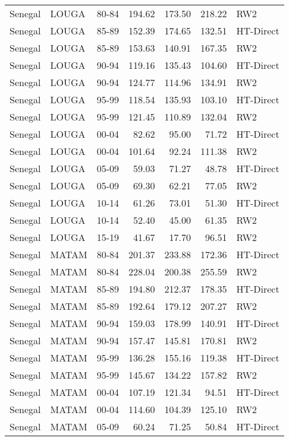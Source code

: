 \begin{longtable}{lllrrrl}
  Senegal & LOUGA & 80-84 & 194.62 & 173.50 & 218.22 & RW2 \\ 
  Senegal & LOUGA & 85-89 & 152.39 & 174.65 & 132.51 & HT-Direct \\ 
  Senegal & LOUGA & 85-89 & 153.63 & 140.91 & 167.35 & RW2 \\ 
  Senegal & LOUGA & 90-94 & 119.16 & 135.43 & 104.60 & HT-Direct \\ 
  Senegal & LOUGA & 90-94 & 124.77 & 114.96 & 134.91 & RW2 \\ 
  Senegal & LOUGA & 95-99 & 118.54 & 135.93 & 103.10 & HT-Direct \\ 
  Senegal & LOUGA & 95-99 & 121.45 & 110.89 & 132.04 & RW2 \\ 
  Senegal & LOUGA & 00-04 & 82.62 & 95.00 & 71.72 & HT-Direct \\ 
  Senegal & LOUGA & 00-04 & 101.64 & 92.24 & 111.38 & RW2 \\ 
  Senegal & LOUGA & 05-09 & 59.03 & 71.27 & 48.78 & HT-Direct \\ 
  Senegal & LOUGA & 05-09 & 69.30 & 62.21 & 77.05 & RW2 \\ 
  Senegal & LOUGA & 10-14 & 61.26 & 73.01 & 51.30 & HT-Direct \\ 
  Senegal & LOUGA & 10-14 & 52.40 & 45.00 & 61.35 & RW2 \\ 
  Senegal & LOUGA & 15-19 & 41.67 & 17.70 & 96.51 & RW2 \\ 
  Senegal & MATAM & 80-84 & 201.37 & 233.88 & 172.36 & HT-Direct \\ 
  Senegal & MATAM & 80-84 & 228.04 & 200.38 & 255.59 & RW2 \\ 
  Senegal & MATAM & 85-89 & 194.80 & 212.37 & 178.35 & HT-Direct \\ 
  Senegal & MATAM & 85-89 & 192.64 & 179.12 & 207.27 & RW2 \\ 
  Senegal & MATAM & 90-94 & 159.03 & 178.99 & 140.91 & HT-Direct \\ 
  Senegal & MATAM & 90-94 & 157.47 & 145.81 & 170.81 & RW2 \\ 
  Senegal & MATAM & 95-99 & 136.28 & 155.16 & 119.38 & HT-Direct \\ 
  Senegal & MATAM & 95-99 & 145.67 & 134.22 & 157.82 & RW2 \\ 
  Senegal & MATAM & 00-04 & 107.19 & 121.34 & 94.51 & HT-Direct \\ 
  Senegal & MATAM & 00-04 & 114.60 & 104.39 & 125.10 & RW2 \\ 
  Senegal & MATAM & 05-09 & 60.24 & 71.25 & 50.84 & HT-Direct \\ 

\end{longtable}
